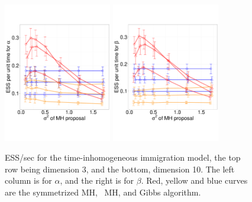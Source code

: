 {\begin{figure}
\begin{minipage}[!hp]{0.9\linewidth}
    \vspace{-.81 in}
  \end{minipage}
  \begin{minipage}[!hp]{0.9\linewidth}
  \centering
    \includegraphics [width=0.420\textwidth, angle=0]{figs/pc_10_alpha.pdf}
    \hspace{.2 in}
    \includegraphics [width=0.420\textwidth, angle=0]{figs/pc_10_beta.pdf}
    \vspace{-.5in}
  \end{minipage}
    \caption{ESS/sec for the time-inhomogeneous immigration model, the top row 
      being dimension 3, and the bottom,
      dimension 10. The left column is for $\alpha$, and the 
    right is for $\beta$. Red, yellow and blue curves are the symmetrized MH,
  \naive\ MH, and Gibbs algorithm.}
     \label{fig:ESS_pc_10}
  \end{figure}
}
